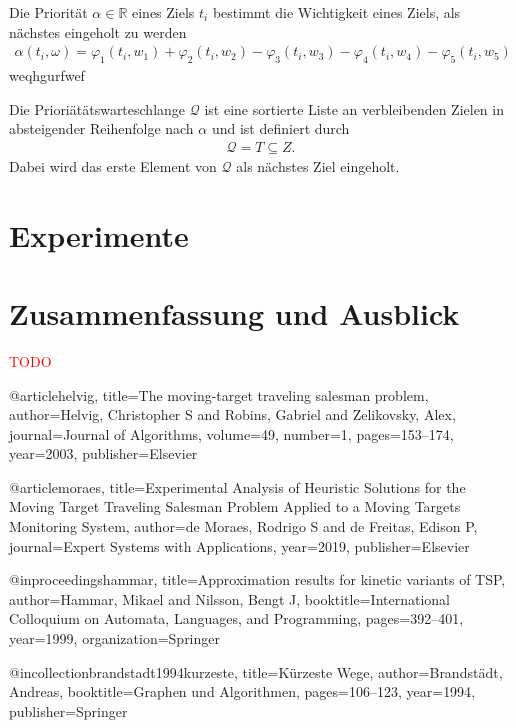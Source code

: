 \documentclass[german,version-2019-11]{uzl-thesis}
\begin{document}
\begin{definition}
Die Priorität $\alpha\in\mathbb{R}$ eines Ziels $t_i$ bestimmt die Wichtigkeit eines Ziels, als nächstes eingeholt zu werden
\begin{align*}
\alpha(t_i, \omega) = \varphi_1(t_i,w_1) + \varphi_2(t_i,w_2) - \varphi_3(t_i,w_3) - \varphi_4(t_i,w_4) - \varphi_5(t_i,w_5)
\end{align*}
weqhgurfwef
\end{definition}

\begin{definition}
Die Prioriätätswarteschlange $\mathcal{Q}$ ist eine sortierte Liste an verbleibenden Zielen in absteigender Reihenfolge nach $\alpha$ und ist definiert durch
\begin{align*}
\mathcal{Q} = T\subseteq Z.
\end{align*}
Dabei wird das erste Element von $\mathcal{Q}$ als nächstes Ziel eingeholt.
\end{definition}

\chapter{Experimente}


\chapter{Zusammenfassung und Ausblick}
\textcolor{red}{TODO}



\begin{bibtex-entries}
@article{helvig,
  title={The moving-target traveling salesman problem},
  author={Helvig, Christopher S and Robins, Gabriel and Zelikovsky, Alex},
  journal={Journal of Algorithms},
  volume={49},
  number={1},
  pages={153--174},
  year={2003},
  publisher={Elsevier}
}

@article{moraes,
  title={Experimental Analysis of Heuristic Solutions for the Moving Target Traveling Salesman Problem Applied to a Moving Targets Monitoring System},
  author={de Moraes, Rodrigo S and de Freitas, Edison P},
  journal={Expert Systems with Applications},
  year={2019},
  publisher={Elsevier}
}

@inproceedings{hammar,
  title={Approximation results for kinetic variants of TSP},
  author={Hammar, Mikael and Nilsson, Bengt J},
  booktitle={International Colloquium on Automata, Languages, and Programming},
  pages={392--401},
  year={1999},
  organization={Springer}
}

@incollection{brandstadt1994kurzeste,
  title={K{\"u}rzeste Wege},
  author={Brandst{\"a}dt, Andreas},
  booktitle={Graphen und Algorithmen},
  pages={106--123},
  year={1994},
  publisher={Springer}
}
\end{bibtex-entries}
\end{document}
